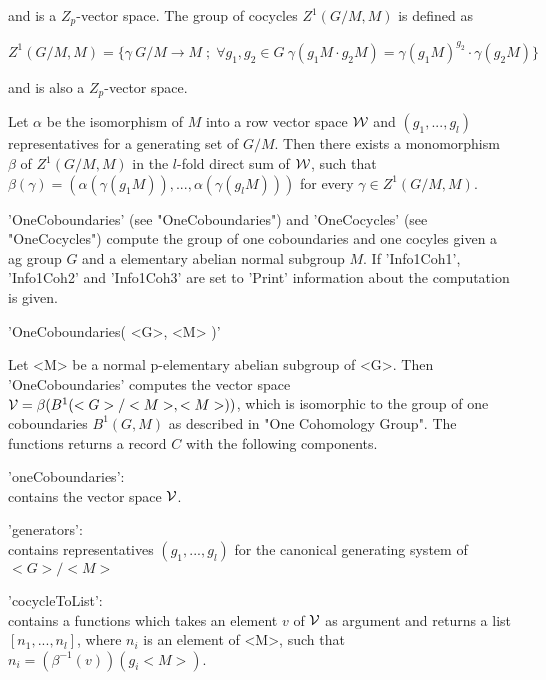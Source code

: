 and is a $Z_p$-vector space.  The group  of cocycles $Z^1(  G/M, M  )$ is
defined as

\begin{displaymath}
  Z^1( G/M, M ) = \{ \gamma \: G/M \rightarrow M \; ; \; \forall
                     g_1, g_2\in G \:
                     \gamma(g_1M \cdot g_2M ) =
                     \gamma(g_1M)^{g_2} \cdot \gamma(g_2M) \}
\end{displaymath}

and is also a $Z_p$-vector space.

Let $\alpha$ be the isomorphism of $M$ into a row vector space ${\cal W}$
and $(g_1,   ..., g_l)$ representatives for  a  generating set  of $G/M$.
Then  there exists a  monomorphism   $\beta$ of $Z^1(   G/M, M )$  in the
$l$-fold direct sum of ${\cal W}$, such that $\beta( \gamma ) = ( \alpha(
\gamma( g_1M ) ), ..., \alpha( \gamma( g_lM ) ) )$  for  every $\gamma\in
Z^1( G/M, M )$.

'OneCoboundaries'  (see   "OneCoboundaries")  and    'OneCocycles'   (see
"OneCocycles") compute  the group of  one   coboundaries and one  cocyles
given a ag group $G$ and a elementary  abelian  normal  subgroup $M$.  If
'Info1Coh1', 'Info1Coh2' and 'Info1Coh3'  are  set to 'Print' information
about the computation is given.


'OneCoboundaries( <G>, <M> )'

Let   <M> be   a normal p-elementary   abelian   subgroup  of  <G>.  Then
'OneCoboundaries' computes   the  vector space  ${\cal  V} =  \beta( B^1(
<G>/<M>, <M>  ) )$, which is isomorphic  to the group of one coboundaries
$B^1( G,  M )$ as described  in  "One  Cohomology Group".   The functions
returns a record $C$ with the following components.

'oneCoboundaries': \\
        contains the vector space ${\cal V}$.

'generators': \\
        contains    representatives    $(g_1,   ...,   g_l)$    for   the
        canonical generating system of $<G> / <M>$

'cocycleToList': \\
        contains a   functions  which takes an   element $v$    of ${\cal
        V}$  as  argument  and  returns  a  list $[  n_1, ...,   n_l  ]$,
        where $n_i$    is an element   of   <M>,   such  that  $n_i  =  (
        \beta^{-1}( v ) )( g_i <M> )$.

